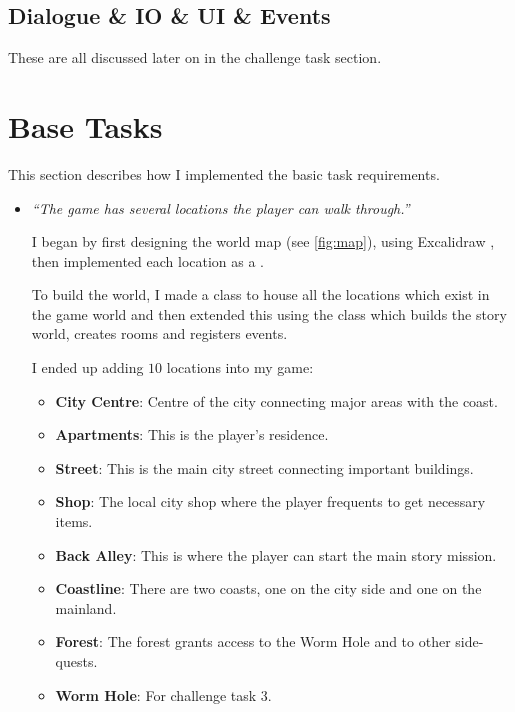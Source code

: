 \documentclass{article}
\begin{document}
\begin{multicols}{2}
            \subsection{Dialogue \& IO \& UI \& Events}
            These are all discussed later on in the challenge task section.

        \section{Base Tasks}

            This section describes how I implemented the basic task requirements.

            \begin{itemize}[leftmargin=*]
                \item \textit{``The game has several locations the player can walk through.''}
                
                    I began by first designing the world map (see \autoref{fig:map}), using Excalidraw \cite{excalidraw}, then implemented each location as a .

                    To build the world, I made a  class to house all the locations which exist in the game world and then extended this using the  class which builds the story world, creates rooms and registers events.

                    I ended up adding $10$ locations into my game:
                    \begin{itemize}[leftmargin=*]
                        \item \textbf{City Centre}: Centre of the city connecting major areas with the coast.
                        \item \textbf{Apartments}: This is the player's residence.
                        \item \textbf{Street}: This is the main city street connecting important buildings.
                        \item \textbf{Shop}: The local city shop where the player frequents to get necessary items.
                        \item \textbf{Back Alley}: This is where the player can start the main story mission.
                        \item \textbf{Coastline}: There are two coasts, one on the city side and one on the mainland.
                        \item \textbf{Forest}: The forest grants access to the Worm Hole and to other side-quests.
                        \item \textbf{Worm Hole}: For challenge task 3.
                    \end{itemize}


\end{itemize}
\end{multicols}
\end{document}
